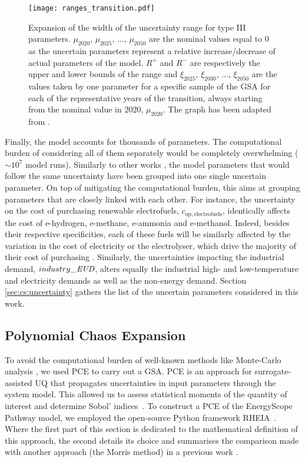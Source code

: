 \begin{figure}[htbp!]
\centering
\texttt{[image: ranges\_transition.pdf]}
\caption{Expansion of the width of the uncertainty range for type III parameters. $\mu_{2020}$, $\mu_{2025}$, ...,  $\mu_{2050}$ are the nominal values equal to 0 as the uncertain parameters represent a relative increase/decrease of actual parameters of the model. $R^+$ and $R^-$ are respectively the upper and lower bounds of the range and $\xi_{2025}$, $\xi_{2030}$, ...,  $\xi_{2050}$ are the values taken by one parameter for a specific sample of the \gls{GSA} for each of the representative years of the transition, always starting from the nominal value in 2020, $\mu_{2020}$. The graph has been adapted from \cite{guevara2022modeling}.}
\label{fig:ranges_transition}
\end{figure}

\newpage
Finally, the model accounts for thousands of parameters. The computational burden of considering all of them separately would be completely overwhelming ($\sim 10^7$ model runs). Similarly to other works \cite{Moret2017,limpens2020impact}, the model parameters that would follow the same uncertainty have been grouped into one single uncertain parameter. On top of mitigating the computational burden, this aims at grouping parameters that are closely linked with each other. For instance, the uncertainty on the cost of purchasing renewable electrofuels, $c_{\mathrm{op,electrofuels}}$, identically affects the cost of e-hydrogen, e-methane, e-ammonia and e-methanol. Indeed, besides their respective specificities, each of these fuels will be similarly affected by the variation in the cost of electricity or the electrolyser, which drive the majority of their cost of purchasing \cite{h2coalition}. Similarly, the uncertainties impacting the industrial demand, $industry\_\emph{EUD}$, alters equally the industrial high- and low-temperature and electricity demands as well as the non-energy demand. Section \ref{sec:cs:uncertainty} gathers the list of the uncertain parameters considered in this work.

\subsection{Polynomial Chaos Expansion}
\label{subsec:pce}

To avoid the computational burden of well-known methods like Monte-Carlo analysis \cite{yue2018review}, we used \gls{PCE} to carry out a \gls{GSA}. \gls{PCE} is an approach for surrogate-assisted \gls{UQ} that propagates uncertainties in input parameters through the system model. This allowed us to assess statistical moments of the quantity of interest and determine Sobol' indices~\cite{coppitters2020robust}. To construct a PCE of the EnergyScope Pathway model, we employed the open-source Python framework RHEIA~\cite{coppitters2022rheia,readthedocs_rheia}. Where the first part of this section is dedicated to the mathematical definition of this approach, the second details its choice and summarises the comparison made with another approach (\ie the Morris method) in a previous work \cite{limpens2020impact}.\\

